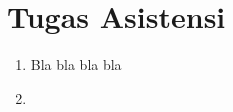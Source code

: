 
\chapter*{Tugas Asistensi}

\begin{enumerate}
    \item Bla bla bla bla \vspace{5px} %
    \lipsum[5] %
    \item \lipsum[6] %
\end{enumerate}